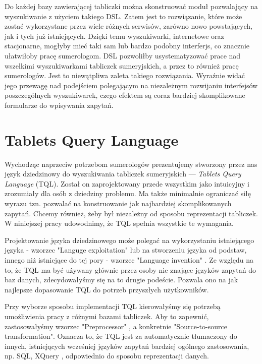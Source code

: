 Do każdej bazy zawierającej tabliczki można skonstruować moduł pozwalający na wyszukiwanie z użyciem takiego DSL.
Zatem jest to rozwiązanie, które może zostać wykorzystane przez wiele różnych serwisów, zarówno nowo powstających, jak i tych już 
istniejących. Dzięki temu wyszukiwarki, internetowe oraz stacjonarne, mogłyby mieć taki sam lub bardzo podobny interferjs, co znacznie 
ułatwiłoby pracę sumerologom. DSL pozwoliłby usystematyzować prace nad wszelkimi wyszukiwarkami tabliczek sumeryjskich, a przez to również 
pracę sumerologów. Jest to niewątpliwa zaleta takiego rozwiązania. Wyraźnie widać jego przewagę nad podejściem polegającym na niezależnym 
rozwijaniu interfejsów poszczególnych wyszukiwarek, czego efektem są coraz bardziej skomplikowane formularze do wpisywania zapytań.


\section*{Tablets Query Language}

Wychodząc naprzeciw potrzebom sumerologów prezentujemy stworzony przez nas język dziedzinowy do wyszukiwania tabliczek sumeryjskich --- 
\textit{Tablets Query Language} (TQL). Został on zaprojektowany przede wszystkim jako intuicyjny i zrozumiały dla osób z dziedziny problemu.
 Ma także minimalnie ograniczać siłę wyrazu tzn. pozwalać na konstruowanie jak najbardziej skomplikowanych zapytań. Chcemy również, żeby 
był niezależny od sposobu reprezentacji tabliczek. W niniejszej pracy udowodnimy, że TQL spełnia wszystkie te wymagania. 


Projektowanie języka dziedzinowego może polegać na wykorzystaniu istniejącego języka - wzorzec "Languge exploitation"
\cite{mernik} lub na stworzeniu języka od podstaw, innego niż istniejące do tej pory - wzorzec "Language invention" \cite{mernik}.
Ze względu na to, że TQL ma być używany głównie przez osoby nie znające języków zapytań do baz danych,
zdecydowałyśmy się na to drugie podeście. Pozwala ono na jak najlepsze dopasowanie TQL do potrzeb przyszłych
użytkowników.


Przy wyborze sposobu implementacji TQL kierowałyśmy się potrzebą umożliwienia pracy z różnymi bazami tabliczek.
Aby to zapewnić, zastosowałyśmy wzorzec "Preprocessor" \cite{mernik}, a konkretnie
"Source-to-source transformation". Oznacza to, że TQL jest za automatycznie tłumaczony do innych,
istniejących wcześniej języków zapytań bardziej ogólnego zastosowania, np. SQL, XQuery \cite{xquery},
odpowiednio do sposobu reprezentacji danych.


